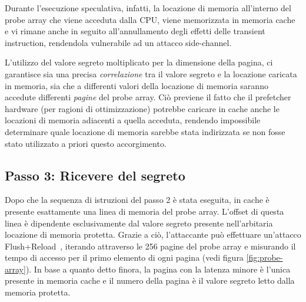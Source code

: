 Durante l'esecuzione speculativa, infatti, la locazione di memoria all'interno del probe array che viene acceduta dalla CPU, viene memorizzata in memoria cache e vi rimane anche in seguito all'annullamento degli effetti delle transient instruction, rendendola vulnerabile ad un attacco side-channel.

L'utilizzo del valore segreto moltiplicato per la dimensione della pagina, ci garantisce sia una precisa \emph{correlazione} tra il valore segreto e la locazione caricata in memoria, sia che a differenti valori della locazione di memoria saranno accedute differenti \emph{pagine} del probe array.
Ciò previene il fatto che il prefetcher hardware (per ragioni di ottimizzazione) potrebbe caricare in cache anche le locazioni di memoria adiacenti a quella acceduta, rendendo impossibile determinare quale locazione di memoria sarebbe stata indirizzata se non fosse stato utilizzato a priori questo accorgimento.

\subsection{Passo 3: Ricevere del segreto}

Dopo che la sequenza di istruzioni del passo 2 è stata eseguita, in cache è presente esattamente una linea di memoria del probe array.
L'offset di questa linea è dipendente esclusivamente dal valore segreto presente nell'arbitaria locazione di memoria protetta.
Grazie a ciò, l'attaccante può effettuare un'attacco Flush+Reload~\cite{yaron:flush-reload}, iterando attraverso le 256 pagine del probe array e misurando il tempo di accesso per il primo elemento di ogni pagina (vedi figura \vref{fig:probe-array}).
In base a quanto detto finora, la pagina con la latenza minore è l'unica presente in memoria cache e il numero della pagina è il valore segreto letto dalla memoria protetta.

